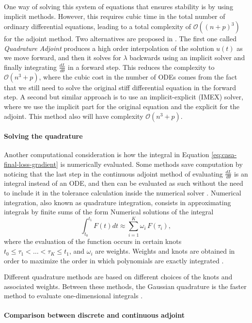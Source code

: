 One way of solving this system of equations that ensures stability is by using implicit methods. 
However, this requires cubic time in the total number of ordinary differential equations, leading to a total complexity of $\mathcal O((n+p)^3)$ for the adjoint method.
Two alternatives are proposed in \cite{kim_stiff_2021}. 
The first one called \textit{Quadrature Adjoint} produces a high order interpolation of the solution $u(t)$ as we move forward, and then it solves for $\lambda$ backwards using an implicit solver and finally integrating $\frac{dL}{d\theta}$ in a forward step.
This reduces the complexity to $\mathcal O (n^3 + p)$, where the cubic cost in the number of ODEs comes from the fact that we still need to solve the original stiff differential equation in the forward step. 
A second but similar approach is to use an implicit-explicit (IMEX) solver, where we use the implicit part for the original equation and the explicit for the adjoint. 
This method also will have complexity $\mathcal O (n^3 + p)$.

\paragraph{Solving the quadrature}

Another computational consideration is how the integral in Equation \eqref{eq:casa-final-loss-gradient} is numerically evaluated. 
Some methods save computation by noticing that the last step in the continuous adjoint method of evaluating $\frac{dL}{d\theta}$ is an integral instead of an ODE, and then can be evaluated as such without the need to include it in the tolerance calculation inside the numerical solver \cite{that-is-not-an-ode}.
Numerical integration, also known as quadrature integration, consists in approximating integrals by finite sums of the form
Numerical solutions of the integral 
\begin{equation}
    \int_{t_0}^{t_1} 
    F(t) dt
    \approx
    \sum_{i=1}^K \omega_i \, F(\tau_i),
\end{equation}
where the evaluation of the function occurs in certain knots $t_0 \leq \tau_1 < \ldots < \tau_K \leq t_1$, and $\omega_i$ are weights. 
Weights and knots are obtained in order to maximize the order in which polynomials are exactly integrated \cite{stoer2002-numerical}. 

Different quadrature methods are based on different choices of the knots and associated weights.
Between these methods, the Gaussian quadrature is the faster method to evaluate one-dimensional integrals \cite{Norcliffe_gaussquadrature_2023}.

\paragraph{Comparison between discrete and continuous adjoint}